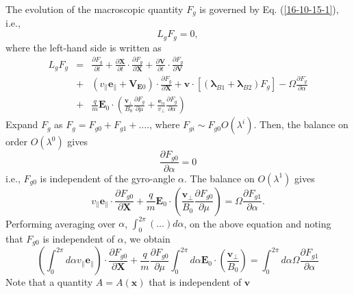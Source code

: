 \documentclass{llncs}
\newcommand{\tmmathbf}[1]{\ensuremath{\boldsymbol{#1}}}
\begin{document}
The evolution of the macroscopic quantity $F_g$ is governed by Eq.
(\ref{16-10-15-1}), i.e.,
\begin{equation}
  L_g F_g = 0,
\end{equation}
where the left-hand side is written as
\begin{eqnarray*}
  L_g F_g & = & \frac{\partial F_g}{\partial t} + \frac{\partial
  \mathbf{X}}{\partial t} \cdot \frac{\partial F_g}{\partial \mathbf{X}} +
  \frac{\partial \mathbf{V}}{\partial t} \cdot \frac{\partial F_g}{\partial
  \mathbf{V}}\\
  & + & (v_{\parallel} \mathbf{e}_{\parallel} +\mathbf{V}_{\mathbf{E}0})
  \cdot \frac{\partial F_g}{\partial \mathbf{X}} +\mathbf{v} \cdot
  [(\tmmathbf{\lambda}_{B 1} +\tmmathbf{\lambda}_{B 2}) F_g] - \Omega
  \frac{\partial F_g}{\partial \alpha}\\
  & + & \frac{q}{m} \mathbf{E}_0 \cdot \left( \frac{\mathbf{v}_{\perp}}{B_0} 
  \frac{\partial F_g}{\partial \mu} + \frac{\tmmathbf{e}_{\alpha}}{v_{\perp}} 
  \frac{\partial F_g}{\partial \alpha} \right)
\end{eqnarray*}
Expand $F_g$ as $F_g = F_{g 0} + F_{g 1} + \ldots$., where $F_{g i} \sim F_{g
0} O (\lambda^i)$. Then, the balance on order $O (\lambda^0)$ gives
\begin{equation}
  \frac{\partial F_{g 0}}{\partial \alpha} = 0
\end{equation}
i.e., $F_{g 0}$ is independent of the gyro-angle $\alpha$. The balance on $O
(\lambda^1)$ gives
\begin{equation}
  v_{\parallel} \mathbf{e}_{\parallel} \cdot \frac{\partial F_{g 0}}{\partial
  \mathbf{X}} + \frac{q}{m} \mathbf{E}_0 \cdot \left(
  \frac{\mathbf{v}_{\perp}}{B_0}  \frac{\partial F_{g 0}}{\partial \mu}
  \right) = \Omega \frac{\partial F_{g 1}}{\partial \alpha} .
\end{equation}
Performing averaging over $\alpha$, $\int_0^{2 \pi} (\ldots) d \alpha$, on the
above equation and noting that $F_{g 0}$ is independent of $\alpha$, we obtain
\begin{equation}
  \label{17-5-15-4} \left( \int_0^{2 \pi} d \alpha v_{\parallel}
  \mathbf{e}_{\parallel} \right) \cdot \frac{\partial F_{g 0}}{\partial
  \mathbf{X}} + \frac{q}{m} \frac{\partial F_{g 0}}{\partial \mu} \int_0^{2
  \pi} d \alpha \mathbf{E}_0 \cdot \left( \frac{\mathbf{v}_{\perp}}{B_0} 
  \right) = \int_0^{2 \pi} d \alpha \Omega \frac{\partial F_{g 1}}{\partial
  \alpha}
\end{equation}
Note that a quantity $A = A (\mathbf{x})$ that is independent of $\mathbf{v}$
\end{document}
